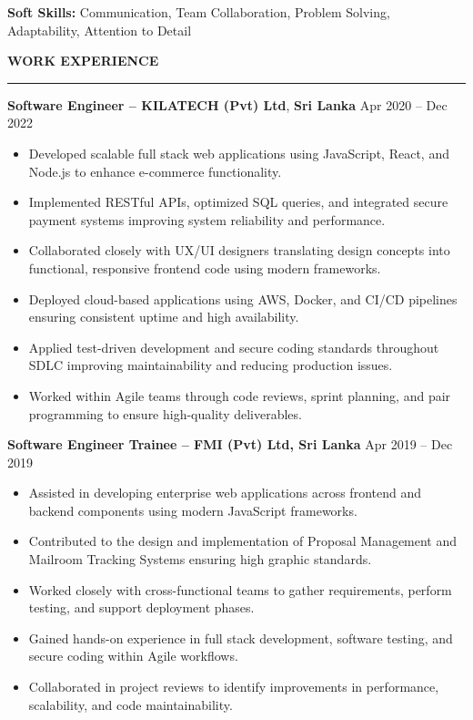 \documentclass[10pt,letterpaper]{article}
\begin{document}
\textbf{Soft Skills:} Communication, Team Collaboration, Problem Solving, Adaptability, Attention to Detail

\vspace{8pt}

\textbf{WORK EXPERIENCE}\\[-8pt]
\noindent\rule{\textwidth}{1pt}

\vspace{-2pt}

\textbf{Software Engineer -- KILATECH (Pvt) Ltd}, \textbf{Sri Lanka} \hfill Apr 2020 -- Dec 2022

\vspace{-1pt}

\begin{itemize}
\item Developed scalable full stack web applications using JavaScript, React, and Node.js to enhance e-commerce functionality.
\item Implemented RESTful APIs, optimized SQL queries, and integrated secure payment systems improving system reliability and performance.
\item Collaborated closely with UX/UI designers translating design concepts into functional, responsive frontend code using modern frameworks.
\item Deployed cloud-based applications using AWS, Docker, and CI/CD pipelines ensuring consistent uptime and high availability.
\item Applied test-driven development and secure coding standards throughout SDLC improving maintainability and reducing production issues.
\item Worked within Agile teams through code reviews, sprint planning, and pair programming to ensure high-quality deliverables.
\end{itemize}

\textbf{Software Engineer Trainee -- FMI (Pvt) Ltd, Sri Lanka} \hfill Apr 2019 -- Dec 2019

\vspace{-1pt}

\begin{itemize}
\item Assisted in developing enterprise web applications across frontend and backend components using modern JavaScript frameworks.
\item Contributed to the design and implementation of Proposal Management and Mailroom Tracking Systems ensuring high graphic standards.
\item Worked closely with cross-functional teams to gather requirements, perform testing, and support deployment phases.
\item Gained hands-on experience in full stack development, software testing, and secure coding within Agile workflows.
\item Collaborated in project reviews to identify improvements in performance, scalability, and code maintainability.
\end{itemize}
\end{document}
